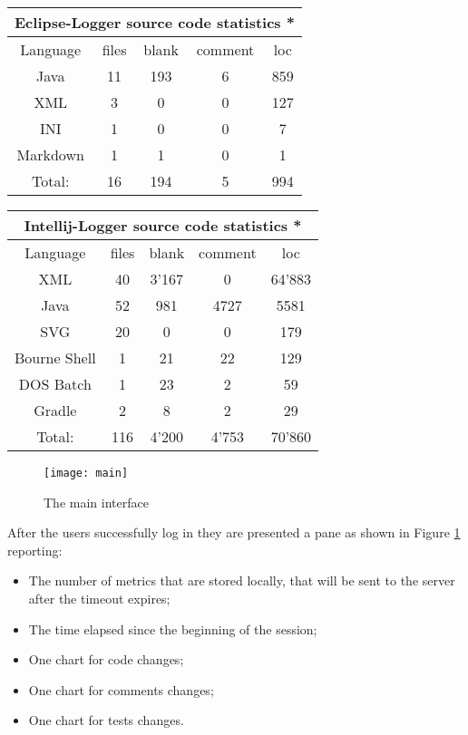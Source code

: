 \documentclass[a4paper,10pt]{report}
\begin{document}
\begin{center}
 \begin{tabular}{|c | c | c | c | c |}
 \hline
 \multicolumn{5}{|c|}{Eclipse-Logger source code statistics *}\\
 \hline
 Language & files & blank & comment & loc \\ [0.5ex] 
 \hline\hline
 Java & 11 & 193 & 6 & 859\\
 \hline
 XML & 3 & 0 & 0 & 127\\
 \hline
 INI & 1 & 0 & 0 & 7\\
 \hline
 Markdown & 1 & 1 & 0 & 1\\
 \hline
 \hline
 Total: & 16 & 194 & 5 & 994\\ [1ex]
 \hline
\end{tabular}
\end{center}

\begin{center}
 \begin{tabular}{|c | c | c | c | c |}
 \hline
 \multicolumn{5}{|c|}{Intellij-Logger source code statistics *}\\
 \hline
 Language & files & blank & comment & loc \\ [0.5ex] 
 \hline\hline
 XML & 40 & 3'167 & 0 & 64'883\\
 \hline
 Java & 52 & 981 & 4727 & 5581\\
 \hline
 SVG & 20 & 0 & 0 & 179\\
 \hline
 Bourne Shell & 1 & 21 & 22 & 129\\
 \hline
 DOS Batch & 1 & 23 & 2 & 59\\
 \hline
 Gradle & 2 & 8 & 2 & 29\\
 \hline
 \hline
 Total: & 116 & 4'200 & 4'753 & 70'860\\ [1ex]
 \hline
\end{tabular}
\end{center}







\newpage
\begin{figure}[h]
	\centering
	\texttt{[image: main]}
	\caption{The main interface}
	\label{fig:main}
\end{figure}

After the users successfully log in they are presented a pane as shown in Figure \ref{fig:main} reporting:

\begin{itemize}
	\item The number of metrics that are stored locally, that will be sent to the server after the timeout expires;
	\item The time elapsed since the beginning of the session;
	\item One chart for code changes;
	\item One chart for comments changes;
	\item One chart for tests changes.
\end{itemize}
\end{document}
